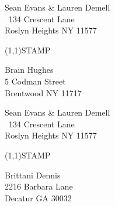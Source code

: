 \documentclass[12pt]{article}
\begin{document}
\clearpage

\begin{minipage}{.5\linewidth} \noindent
Sean Evans \& Lauren Demell\\\ 
134 Crescent Lane\\ 
Roslyn Heights NY 11577
\end{minipage}
\begin{minipage}{.5\linewidth \hspace{-.2in} \vspace{-.3in}}
\begin{flushright}
\framebox(1,1){STAMP}
\end{flushright}
\end{minipage}

\begin{center} \begin{Huge} \vspace*{\fill}
Brain Hughes\\
5 Codman Street\\
Brentwood NY 11717\\
\vspace{\fill} \end{Huge} \end{center}

\clearpage

\begin{minipage}{.5\linewidth} \noindent
Sean Evans \& Lauren Demell\\\ 
134 Crescent Lane\\ 
Roslyn Heights NY 11577
\end{minipage}
\begin{minipage}{.5\linewidth \hspace{-.2in} \vspace{-.3in}}
\begin{flushright}
\framebox(1,1){STAMP}
\end{flushright}
\end{minipage}

\begin{center} \begin{Huge} \vspace*{\fill}
Brittani Dennis\\
2216 Barbara Lane\\
Decatur GA 30032\\
\vspace{\fill} \end{Huge} \end{center}

\clearpage
\end{document}
